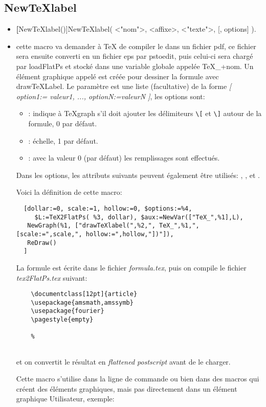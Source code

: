 \subsection{NewTeXlabel}\label{macNewTeXlabel}
\begin{itemize}
 \item \util \textbf[NewTeXlabel()]{NewTeXlabel( <"nom">, <affixe>, <"texte">, [, options] )}.
 \item \desc cette macro va demander à \TeX{} de compiler le  dans un fichier pdf, ce fichier sera ensuite converti en un fichier eps par pstoedit, puis celui-ci sera chargé par loadFlatPs et stocké dans une variable globale appelée TeX\_+nom. Un élément graphique appelé  est créée pour dessiner la formule avec drawTeXLabel. Le paramètre  est une liste (facultative) de la forme \textsl{[ option1:= valeur1, ..., optionN:=valeurN ]}, les options sont:
  \begin{itemize}
  \item {}: indique à TeXgraph s'il doit ajouter les délimiteurs \verb|\[| et \verb|\]| autour de la formule, $0$ par défaut.
  \item {}: échelle, 1 par défaut.
  \item {}: avec la valeur 0 (par défaut) les remplissages sont effectués.
  \end{itemize}
Dans les options, les attributs suivants peuvent également être utilisés: , ,  et .

Voici la définition de cette macro:

\begin{small}
\begin{verbatim}
  [dollar:=0, scale:=1, hollow:=0, $options:=%4,
     $L:=TeX2FlatPs( %3, dollar), $aux:=NewVar(["TeX_",%1],L),
   NewGraph(%1, ["drawTeXlabel(",%2,", TeX_",%1,", [scale:=",scale,", hollow:=",hollow,"])"]),
   ReDraw()
  ]
\end{verbatim}
\end{small}

La formule est écrite dans le fichier \textit{formula.tex}, puis on compile le fichier \textit{tex2FlatPs.tex} suivant:

\begin{verbatim}
    \documentclass[12pt]{article}
    \usepackage{amsmath,amssymb}
    \usepackage{fourier}
    \pagestyle{empty}
    
    %
    
\end{verbatim}

et on convertit le résultat en \textit{flattened postscript} avant de le charger.

Cette macro s'utilise dans la ligne de commande ou bien dans des macros qui créent des éléments graphiques, mais pas directement dans un élément graphique Utilisateur, exemple:

\centerline{}
\end{itemize}


